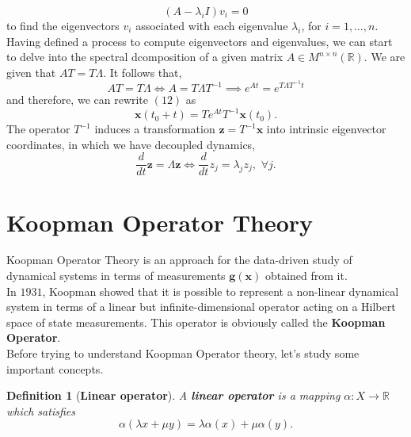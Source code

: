 \documentclass[]{article}
\newtheorem{definition}{Definition}
\begin{document}
\begin{equation}
	(A-\lambda_i I)v_i=0
\end{equation}
to find the eigenvectors $v_i$ associated with each eigenvalue $\lambda_i$, for $i=1,\dots,n$.
Having defined a process to compute eigenvectors and eigenvalues, we can start to delve into the spectral dcomposition of a given matrix $A \in M^{n \times n}(\mathbb{R})$. We are given that $AT=T\Lambda$. It follows that,
\begin{equation}
	AT=T\Lambda \iff A = T\Lambda T^{-1} \implies e^{At} = e^{T\Lambda T^{-1} t} 
\end{equation}
and therefore, we can rewrite $(12)$ as
\begin{equation}
	\textbf{x}(t_0+t) = Te^{At}T^{-1}\textbf{x}(t_0).
\end{equation}
The operator $T^{-1}$ induces a transformation $\textbf{z}=T^{-1}\textbf{x}$ into intrinsic eigenvector coordinates, in which we have decoupled dynamics, 
\begin{equation}
	\frac{d}{dt} \textbf{z} = \Lambda \textbf{z} \iff \frac{d}{dt} z_j=\lambda_j z_j, \,\, \forall j.
\end{equation}

\section{Koopman Operator Theory}
Koopman Operator Theory is an approach for the data-driven study of dynamical systems in terms of measurements $\textbf{g}(\textbf{x})$ obtained from it. \\
In $1931$, Koopman showed that it is possible to represent a non-linear dynamical system in terms of a linear but infinite-dimensional operator acting on a Hilbert space of state measurements. This operator is obviously called the \textbf{Koopman Operator}. \\
Before trying to understand Koopman Operator theory, let's study some important concepts.
\begin{definition}[\textbf{Linear operator}]
A \textbf{linear operator} is a mapping $\alpha:X \to \mathbb{R}$ which satisfies
\begin{equation}
	\alpha(\lambda x + \mu y) = \lambda \alpha(x) + \mu \alpha(y).
\end{equation}
\end{definition}
\end{document}
